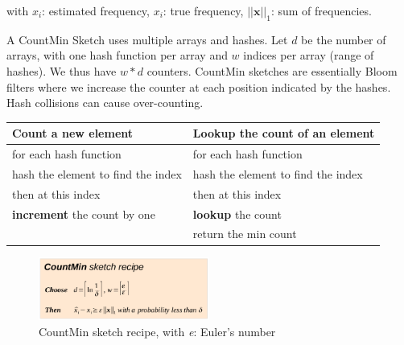 \documentclass[11pt,oneside,a4paper]{article}
\begin{document}
\noindent with $\hat{x_i}$: estimated frequency, $x_i$: true frequency, $||\textbf{x}||_1$: sum of frequencies.\newline

\noindent A CountMin Sketch uses multiple arrays and hashes. Let $d$ be the number of arrays, with one hash function per array and $w$ indices per array (range of hashes). We thus have $w*d$ counters. CountMin sketches are essentially Bloom filters where we increase the counter at each position indicated by the hashes. Hash collisions can cause over-counting.

\begin{center}
	\begin{tabular}{ |p{75mm}|p{75mm}| } 
		\hline
		Count a new element & Lookup the count of an element \\ 
		\hline
		for each hash function & for each hash function\\
		\hspace{3mm} hash the element to find the index & \hspace{3mm} hash the element to find the index \\
		\hspace{3mm} then at this index & \hspace{3mm} then at this index \\
		\hspace{6mm} \textbf{increment} the count by one & \hspace{6mm} \textbf{lookup} the count \\
		& return the min count \\
		\hline
	\end{tabular}
\end{center}

\begin{figure}[hb]
	\centering
	\includegraphics[width=0.5\textwidth,scale=1]{figures/countminsketch_recipe}
	\caption{CountMin sketch recipe, with \textit{e}: Euler's number \cite{advnet}}
	\label{fig:countminsketch_recipe}
\end{figure}
\end{document}
